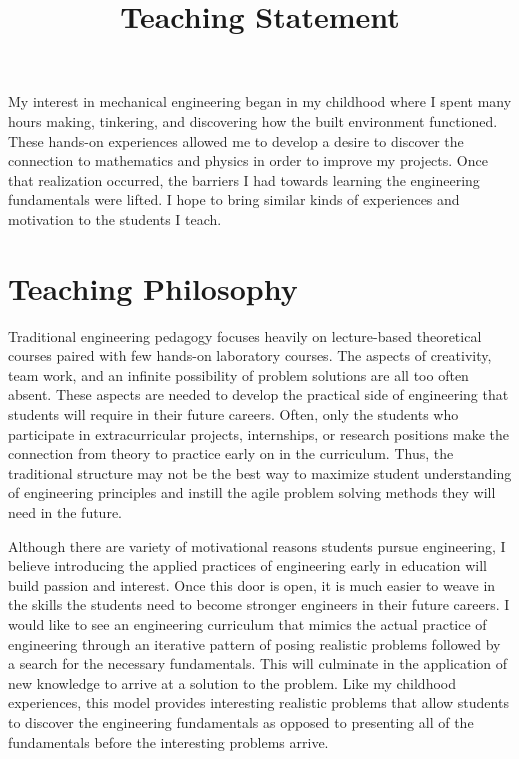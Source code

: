 \documentclass{article}
\title{Teaching Statement}
\date{}
\begin{document}

My interest in mechanical engineering began in my childhood where I spent many
hours making, tinkering, and discovering how the built environment functioned.
These hands-on experiences allowed me to develop a desire to discover the
connection to mathematics and physics in order to improve my projects. Once
that realization occurred, the barriers I had towards learning the engineering
fundamentals were lifted. I hope to bring similar kinds of experiences and
motivation to the students I teach.

\section*{Teaching Philosophy}
%
Traditional engineering pedagogy focuses heavily on lecture-based theoretical
courses paired with few hands-on laboratory courses. The aspects of creativity,
team work, and an infinite possibility of problem solutions are all too often
absent. These aspects are needed to develop the practical side of engineering
that students will require in their future careers. Often, only the students
who participate in extracurricular projects, internships, or research positions
make the connection from theory to practice early on in the curriculum. Thus,
the traditional structure may not be the best way to maximize student
understanding of engineering principles and instill the agile problem solving
methods they will need in the future.

Although there are variety of motivational reasons students pursue engineering,
I believe introducing the applied practices of engineering early in education
will build passion and interest. Once this door is open, it is much easier to
weave in the skills the students need to become stronger engineers in their
future careers. I would like to see an engineering curriculum that mimics the
actual practice of engineering through an iterative pattern of posing realistic
problems followed by a search for the necessary fundamentals. This will
culminate in the application of new knowledge to arrive at a solution to the
problem.  Like my childhood experiences, this model provides interesting
realistic problems that allow students to discover the engineering fundamentals
as opposed to presenting all of the fundamentals before the interesting
problems arrive.
\end{document}
